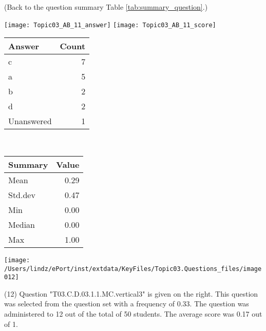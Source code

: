 \documentclass[12pt,english,nohyper]{tufte-handout}\usepackage[]{graphicx}\usepackage[]{color}
\begin{document}
 (Back to the question summary Table \ref{tab:summary_question}.)

\begin{center} \texttt{[image: Topic03\_AB\_11\_answer]} \texttt{[image: Topic03\_AB\_11\_score]} \end{center} 

\begin{center}%
\begin{tabular}{lr}
  \hline
Answer & Count \\ 
  \hline
c &   7 \\ 
  a &   5 \\ 
  b &   2 \\ 
  d &   2 \\ 
  Unanswered &   1 \\ 
   \hline
\end{tabular}
~~~~~~~~%
\begin{tabular}{lr}
  \hline
Summary & Value \\ 
  \hline
Mean & 0.29 \\ 
  Std.dev & 0.47 \\ 
  Min & 0.00 \\ 
  Median & 0.00 \\ 
  Max & 1.00 \\ 
   \hline
\end{tabular}
\end{center}\newpage{}



\vspace{4cm}\begin{marginfigure}\texttt{[image: /Users/lindz/ePort/inst/extdata/KeyFiles/Topic03.Questions\_files/image012]}\end{marginfigure}\vspace{-4cm} (12) Question "T03.C.D.03.1.1.MC.vertical3" is given on the right. This question was selected from the question set with a frequency of 0.33. The question was administered to 12 out of the total of 50 students. The average score was 0.17 out of 1.
\end{document}
